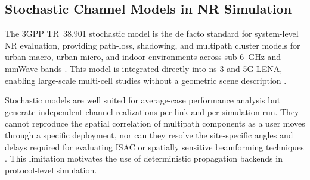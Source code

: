 \subsection{Stochastic Channel Models in NR Simulation}
The 3GPP TR~38.901 stochastic model is the de facto standard for system-level NR evaluation, providing path-loss, shadowing, and multipath cluster models for urban macro, urban micro, and indoor environments across sub-6~GHz and mmWave bands \cite{tr38901}.
This model is integrated directly into ns-3 and 5G-LENA, enabling large-scale multi-cell studies without a geometric scene description \cite{ns3,5glena}.

Stochastic models are well suited for average-case performance analysis but generate independent channel realizations per link and per simulation run.
They cannot reproduce the spatial correlation of multipath components as a user moves through a specific deployment, nor can they resolve the site-specific angles and delays required for evaluating ISAC or spatially sensitive beamforming techniques \cite{alsamman_mmwave,han_thz,zhou_isac}.
This limitation motivates the use of deterministic propagation backends in protocol-level simulation.
